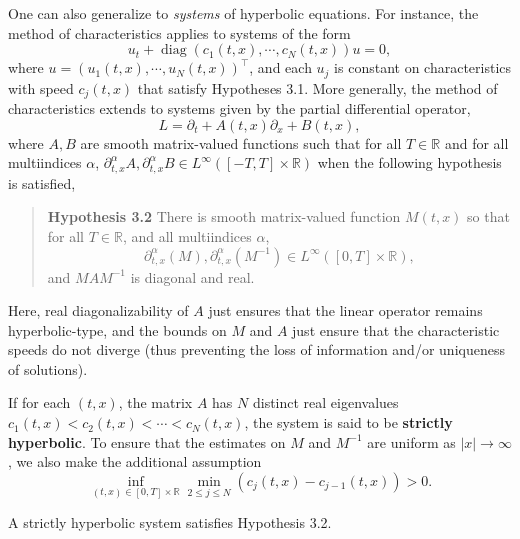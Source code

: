 \documentclass{article}
\begin{document}
One can also generalize to \textit{systems} of hyperbolic equations. For instance, the method of characteristics applies to systems of the form 
\begin{equation*}
	u_{t} + \operatorname{diag}(c_{1}(t, x), \dotsm, c_{N}(t,x))u = 0, 
\end{equation*}
where $u = (u_{1}(t, x), \dotsm, u_{N}(t, x))^{\top}$, and each $u_{j}$ is constant on characteristics with speed $c_{j}(t, x)$ that satisfy Hypotheses 3.1. More generally, the method of characteristics extends to systems given by the partial differential operator, 
\begin{equation*}
	L = \partial_{t} + A(t, x)\partial_{x} + B(t, x), 
\end{equation*}
where $A, B$ are smooth matrix-valued functions such that for all $T \in \mathbb{R}$ and for all multiindices $\alpha$, $\partial^{\alpha}_{t, x}A, \partial^{\alpha}_{t, x}B \in L^{\infty}([-T, T] \times \mathbb{R})$ when the following hypothesis is satisfied, 
\begin{quote}
	\textbf{Hypothesis 3.2} There is  smooth matrix-valued function $M(t, x)$ so that for all $T \in \mathbb{R}$, and all multiindices $\alpha$, 
	\begin{equation*}
		\partial_{t, x}^{\alpha}(M), \partial_{t, x}^{\alpha}(M^{-1}) \in L^{\infty}([0,T] \times \mathbb{R}), 
	\end{equation*}
	and $MAM^{-1}$ is diagonal and real. 
\end{quote} 

Here, real diagonalizability of $A$ just ensures that the linear operator remains hyperbolic-type, and the bounds on $M$ and $A$ just ensure that the characteristic speeds do not diverge (thus preventing the loss of information and/or uniqueness of solutions). 

\begin{definition}
	If for each $(t, x)$, the matrix $A$ has $N$ distinct real eigenvalues $c_{1}(t, x) < c_{2}(t, x) < \dotsm < c_{N}(t, x)$, the system is said to be \textbf{strictly hyperbolic}. To ensure that the estimates on $M$ and $M^{-1}$ are uniform as $|x|\to \infty$, we also make the additional assumption 
	\begin{equation*}
		\inf_{(t,x)\in [0,T] \times \mathbb{R}}\min_{2 \leq j \leq N}\left(c_{j}(t,  x) - c_{j - 1}(t, x)\right) > 0. 
	\end{equation*}
	
	A strictly hyperbolic system satisfies Hypothesis 3.2. 
\end{definition} 
\end{document}
